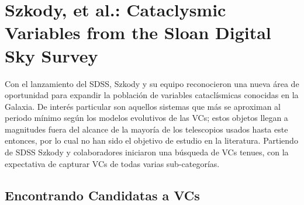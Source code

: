 \section{Szkody, et al.: Cataclysmic Variables from the Sloan Digital Sky Survey}

Con el lanzamiento del SDSS, Szkody y su equipo reconocieron una nueva área de
oportunidad para expandir la población de variables cataclísmicas conocidas en
la Galaxia. De interés particular son aquellos sistemas que más se aproximan al
periodo mínimo según los modelos evolutivos de las VCs; estos objetos llegan a
magnitudes fuera del alcance de la mayoría de los telescopios usados hasta este
entonces, por lo cual no han sido el objetivo de estudio en la literatura.
Partiendo de SDSS Szkody y colaboradores iniciaron una búsqueda de VCs tenues,
con la expectativa de capturar VCs de todas varias sub-categorías.

\subsection{Encontrando Candidatas a VCs}
